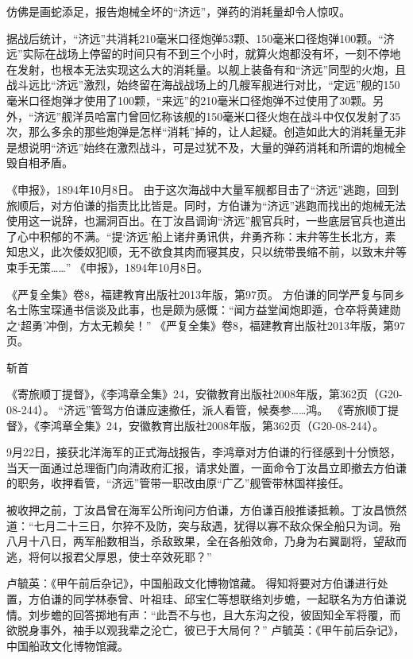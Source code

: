 \documentclass[12pt,UTF8]{ctexbook}
\begin{document}
仿佛是画蛇添足，报告炮械全坏的“济远”，弹药的消耗量却令人惊叹。

据战后统计，“济远”共消耗210毫米口径炮弹53颗、150毫米口径炮弹100颗。“济远”实际在战场上停留的时间只有不到三个小时，就算火炮都没有坏，一刻不停地在发射，也根本无法实现这么大的消耗量。以舰上装备有和“济远”同型的火炮，且战斗远比“济远”激烈，始终留在海战战场上的几艘军舰进行对比，“定远”舰的150毫米口径炮弹才使用了100颗，“来远”的210毫米口径炮弹不过使用了30颗。另外，“济远”舰洋员哈富门曾回忆称该舰的150毫米口径火炮在战斗中仅仅发射了35次，那么多余的那些炮弹是怎样“消耗”掉的，让人起疑。创造如此大的消耗量无非是想说明“济远”始终在激烈战斗，可是过犹不及，大量的弹药消耗和所谓的炮械全毁自相矛盾。

《申报》，1894年10月8日。
由于这次海战中大量军舰都目击了“济远”逃跑，回到旅顺后，对方伯谦的指责比比皆是。同时，方伯谦为“济远”逃跑而找出的炮械无法使用这一说辞，也漏洞百出。在丁汝昌调询“济远”舰官兵时，一些底层官兵也道出了心中积郁的不满。“提‘济远’船上诸弁勇讯供，弁勇齐称：末弁等生长北方，素知忠义，此次倭奴犯顺，无不欲食其肉而寝其皮，只以统带畏缩不前，以致末弁等束手无策……” 《申报》，1894年10月8日。

《严复全集》卷8，福建教育出版社2013年版，第97页。
方伯谦的同学严复与同乡名士陈宝琛通书信谈及此事，也是颇为感慨：“闻方益堂闻炮即遁，仓卒将黄建勋之‘超勇’冲倒，方太无赖矣！” 《严复全集》卷8，福建教育出版社2013年版，第97页。

斩首

《寄旅顺丁提督》，《李鸿章全集》24，安徽教育出版社2008年版，第362页（G20-08-244）。
“济远”管驾方伯谦应速撤任，派人看管，候奏参……鸿。 《寄旅顺丁提督》，《李鸿章全集》24，安徽教育出版社2008年版，第362页（G20-08-244）。

9月22日，接获北洋海军的正式海战报告，李鸿章对方伯谦的行径感到十分愤怒，当天一面通过总理衙门向清政府汇报，请求处置，一面命令丁汝昌立即撤去方伯谦的职务，收押看管，“济远”管带一职改由原“广乙”舰管带林国祥接任。

被收押之前，丁汝昌曾在海军公所询问方伯谦，方伯谦百般推诿抵赖。丁汝昌愤然道：“七月二十三日，尔猝不及防，突与敌遇，犹得以寡不敌众保全船只为词。殆八月十八日，两军船数相当，杀敌致果，全在各船效命，乃身为右翼副将，望敌而逃，将何以报君父厚恩，使士卒效死耶？”

卢毓英：《甲午前后杂记》，中国船政文化博物馆藏。
得知将要对方伯谦进行处置，方伯谦的同学林泰曾、叶祖珪、邱宝仁等想联络刘步蟾，一起联名为方伯谦说情。刘步蟾的回答掷地有声：“此吾不与也，且大东沟之役，彼固知全军将覆，而欲脱身事外，袖手以观我辈之沦亡，彼已于大局何？” 卢毓英：《甲午前后杂记》，中国船政文化博物馆藏。
\end{document}
